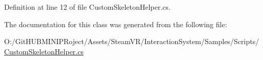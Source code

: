 Definition at line 12 of file Custom\+Skeleton\+Helper.\+cs.



The documentation for this class was generated from the following file\+:\begin{DoxyCompactItemize}
\item 
O\+:/\+Git\+H\+U\+B\+M\+I\+N\+I\+P\+Roject/\+Assets/\+Steam\+V\+R/\+Interaction\+System/\+Samples/\+Scripts/\mbox{\hyperlink{_custom_skeleton_helper_8cs}{Custom\+Skeleton\+Helper.\+cs}}\end{DoxyCompactItemize}
